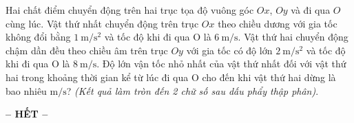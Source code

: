 \begin{ex}
	Hai chất điểm chuyển động trên hai trục tọa độ vuông góc $Ox$, $Oy$ và đi qua $O$ cùng lúc. Vật thứ nhất chuyển động trên trục $Ox$ theo chiều dương với gia tốc không đổi bằng $\SI{1}{\meter/\second^2}$ và tốc độ khi đi qua O là $\SI{6}{\meter/\second}$. Vật thứ hai chuyển động chậm dần đều theo chiều âm trên trục $Oy$ với gia tốc có độ lớn $\SI{2}{\meter/\second^2}$ và  tốc độ khi đi qua O là $\SI{8}{\meter/\second}$. Độ lớn vận tốc nhỏ nhất của vật thứ nhất đối với vật thứ hai trong khoảng thời gian kể từ lúc đi qua O cho đến khi vật thứ hai dừng là bao nhiêu $\si{\meter/\second}$? \textit{(Kết quả làm tròn đến 2 chữ số sau dấu phẩy thập phân)}.
	\loigiai{
		
	}
\end{ex}
\begin{center}
	\textbf{-- HẾT --}
\end{center}